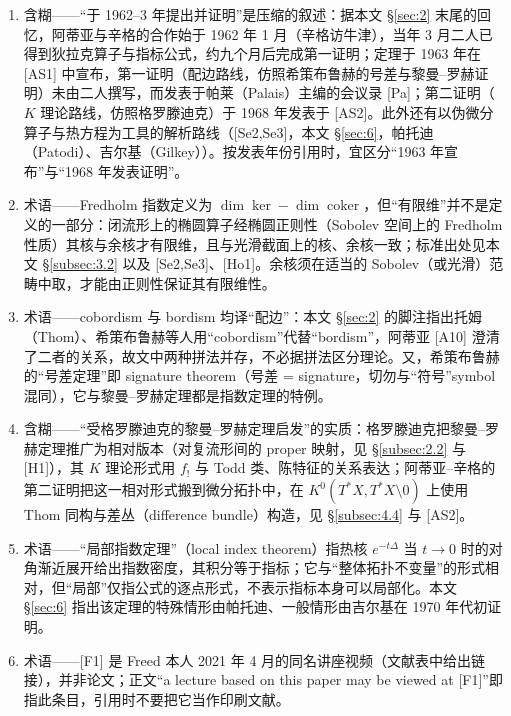 \documentclass[11pt]{amsart}
\theoremstyle{definition}
\theoremstyle{remark}
\theoremstyle{plain}
\numberwithin{equation}{section}
\renewcommand{\:}{\colon}
\DeclareMathOperator{\coker}{coker}
\begin{document}
\begin{enumerate}[leftmargin=2.2em,itemsep=2pt,topsep=2pt]
  \item 含糊——“于 1962–3 年提出并证明”是压缩的叙述：据本文 \S\ref{sec:2} 末尾的回忆，阿蒂亚与辛格的合作始于 1962 年 1 月（辛格访牛津），当年 3 月二人已得到狄拉克算子与指标公式，约九个月后完成第一证明；定理于 1963 年在 [AS1] 中宣布，第一证明（配边路线，仿照希策布鲁赫的号差与黎曼–罗赫证明）未由二人撰写，而发表于帕莱（Palais）主编的会议录 [Pa]；第二证明（$K$ 理论路线，仿照格罗滕迪克）于 1968 年发表于 [AS2]。此外还有以伪微分算子与热方程为工具的解析路线（[Se2,Se3]，本文 \S\ref{sec:6}，帕托迪（Patodi）、吉尔基（Gilkey））。按发表年份引用时，宜区分“1963 年宣布”与“1968 年发表证明”。
  \item 术语——Fredholm 指数定义为 $\dim\ker-\dim\coker$，但“有限维”并不是定义的一部分：闭流形上的椭圆算子经椭圆正则性（Sobolev 空间上的 Fredholm 性质）其核与余核才有限维，且与光滑截面上的核、余核一致；标准出处见本文 \S\ref{subsec:3.2} 以及 [Se2,Se3]、[Ho1]。余核须在适当的 Sobolev（或光滑）范畴中取，才能由正则性保证其有限维性。
  \item 术语——cobordism 与 bordism 均译“配边”：本文 \S\ref{sec:2} 的脚注指出托姆（Thom）、希策布鲁赫等人用“cobordism”代替“bordism”，阿蒂亚 [A10] 澄清了二者的关系，故文中两种拼法并存，不必据拼法区分理论。又，希策布鲁赫的“号差定理”即 signature theorem（号差 = signature，切勿与“符号”symbol 混同），它与黎曼–罗赫定理都是指数定理的特例。
  \item 含糊——“受格罗滕迪克的黎曼–罗赫定理启发”的实质：格罗滕迪克把黎曼–罗赫定理推广为相对版本（对复流形间的 proper 映射，见 \S\ref{subsec:2.2} 与 [H1]），其 $K$ 理论形式用 $f_!$ 与 Todd 类、陈特征的关系表达；阿蒂亚–辛格的第二证明把这一相对形式搬到微分拓扑中，在 $K^0(T^*X,T^*X\setminus0)$ 上使用 Thom 同构与差丛（difference bundle）构造，见 \S\ref{subsec:4.4} 与 [AS2]。
  \item 术语——“局部指数定理”（local index theorem）指热核 $e^{-t\Delta }$ 当 $t\to0$ 时的对角渐近展开给出指数密度，其积分等于指标；它与“整体拓扑不变量”的形式相对，但“局部”仅指公式的逐点形式，不表示指标本身可以局部化。本文 \S\ref{sec:6} 指出该定理的特殊情形由帕托迪、一般情形由吉尔基在 1970 年代初证明。
  \item 术语——[F1] 是 Freed 本人 2021 年 4 月的同名讲座视频（文献表中给出链接），并非论文；正文“a lecture based on this paper may be viewed at [F1]”即指此条目，引用时不要把它当作印刷文献。
\end{enumerate}
\end{document}
